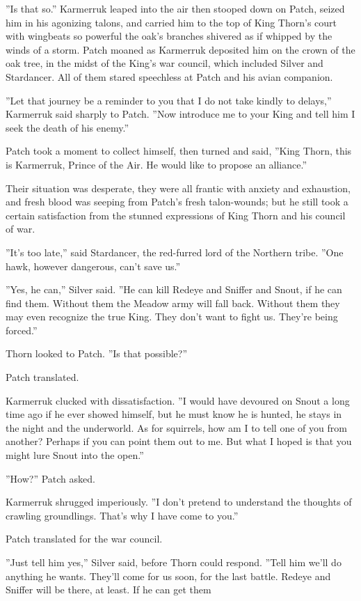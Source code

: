 \documentclass[11pt]{article}
\begin{document}
 ''Is that so.'' Karmerruk leaped into the air %
 then stooped down on Patch, seized him in his agonizing talons, and carried him to the top of King Thorn's court with wingbeats so powerful the oak's branches shivered as if whipped by the winds of a storm. Patch moaned as Karmerruk deposited him on the crown of the oak tree, in the midst of the King's war council, which included Silver and Stardancer. All of them stared speechless at Patch and his avian companion.\par
 ''Let that journey be a reminder to you that I do not take kindly to delays,'' Karmerruk said sharply to Patch. ''Now introduce me to your King and tell him I seek the death of his enemy.''\par
 Patch took a moment to collect himself, then turned and said, ''King Thorn, this is Karmerruk, Prince of the Air. He would like to propose an alliance.''\par
 Their situation was desperate, they were all frantic with anxiety and exhaustion, and fresh blood was seeping from Patch's fresh talon-wounds; but he still took a certain satisfaction from the stunned expressions of King Thorn and his council of war.\par
 ''It's too late,'' said Stardancer, the red-furred lord of the Northern tribe. ''One hawk, however dangerous, can't save us.''\par
 ''Yes, he can,'' Silver said. ''He can kill Redeye and Sniffer and Snout, if he can find them. Without them the Meadow army will fall back. Without them they may even recognize the true King. They don't want to fight us. They're being forced.''\par
 Thorn looked to Patch. ''Is that possible?''\par
 Patch translated.\par
 Karmerruk clucked with dissatisfaction. ''I would have devoured on Snout a long time ago if he ever showed himself, but he must know he is hunted, he stays in the night and the underworld. As for squirrels, how am I to tell one of you from another? Perhaps if you can point them out to me. But what I hoped is that you might lure Snout into the open.''\par
 ''How?'' Patch asked.\par
 Karmerruk shrugged imperiously. ''I don't pretend to understand the thoughts of crawling groundlings. That's why I have come to you.''\par
 Patch translated for the war council.\par
 ''Just tell him yes,'' Silver said, before Thorn could respond. ''Tell him we'll do anything he wants. They'll come for us soon, for the last battle. Redeye and Sniffer will be there, at least. If he can get them %
\end{document}
